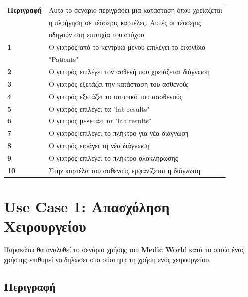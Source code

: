\documentclass{article}
\newcommand\T{\rule{0pt}{2.6ex}}       %
\newcommand\B{\rule[-1.2ex]{0pt}{0pt}}
\begin{document}
 \begin{center}
     \begin{tabular}{|l|l|}
     \hline
      \textbf{Περιγραφή }   & Αυτό το σενάριο περιγράφει μια κατάσταση όπου χρείαζεται\\& η πλοήγηση σε τέσσερις καρτέλες. Αυτές οι τέσσερις\\& οδηγούν στη επιτυχία του στόχου. \T\B \\ 
      \hline
      \textbf{1} & Ο γιατρός από το κεντρικό μενού επιλέγει το εικονίδιο\\& "Patients" \T\B \\
      \hline
      \textbf{2} & Ο γιατρός επιλέγει τον ασθενή που χρειάζεται διάγνωση\T\B \\
      \hline
      \textbf{3} & Ο γιατρός εξετάζει την κατάσταση του ασθενούς \T\B \\
      \hline
      \textbf{4} & Ο γιατρός εξετάζει το ιστορικό του ασσθενούς \T\B \\
      \hline
      \textbf{5} & Ο γιατρός επιλέγει τα "lab results" \T\B \\
      \hline
      \textbf{6} & Ο γιατρός μελετάει τα "lab results" \T\B \\
      \hline
      \textbf{7} & Ο γιατρός επιλέγει το πλήκτρο για νέα διάγνωση \T\B \\
      \hline
      \textbf{8} & Ο γιατρός εισάγει τη νέα διάγνωση \T\B \\
      \hline
      \textbf{9} & Ο γιατρός επιλέγει το πλήκτρο ολοκλήρωσης \T\B \\
      \hline
      \textbf{10} & Στην καρτέλα του ασθενούς εμφανίζεται η διάγνωση \T\B \\
      \hline
     \end{tabular}
 \end{center}
 
 
 \section{Use Case 1: Απασχόληση Χειρουργείου}
 
 Παρακάτω θα αναλυθεί το σενάριο χρήσης του \textbf{Medic World} κατά το οποίο ένας χρήστης επιθυμεί να δηλώσει στο σύστημα τη χρήση ενός χειρουργείου.

\subsection{Περιγραφή}
\end{document}
